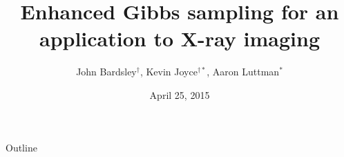 \documentclass[]{beamer}
\title{Enhanced Gibbs sampling for an application to X-ray imaging}
\author{John Bardsley$^\dagger$, Kevin Joyce$^{\dagger*}$, Aaron Luttman$^{*}$} %
\date[UM Colloquium]{April 25, 2015}
\institute[The University of Montana] %
{
  $^\dagger$The University of Montana\\
  $^{*}$National Security Technologies LLC
}
\begin{document}
\nocite{bardsley2012mcmc,agapiou2014analysis,stuart2010,calvetti2007introduction,van2008partially}

\begin{frame}
  \titlepage
\end{frame}

\begin{frame}{Outline}
  \tableofcontents
\end{frame}


\end{document}
